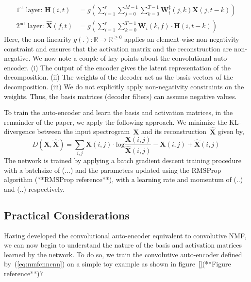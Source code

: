 \documentclass{article}
\begin{document}
\begin{align}
    \text{$1^{\text{st}}$ layer:~}\mathbf{H}(i,t) &= g\left(\sum_{i=1}^{r} \sum_{j=0}^{M-1} \sum_{k=0}^{T-1} \mathbf{W}_{i}^{\ddagger}(j,k)\mathbf{X}(j,t-k)\right) \\
    \text{$2^{\text{nd}}$ layer:~}\hat{\mathbf{X}}(f,t) &= g\left(\sum_{i=1}^{r} \sum_{k=0}^{T-1} \mathbf{W}_{i}(k,f)\cdot\mathbf{H}(i,t-k)\right)
    \label{eq:nmfcnncnn}
\end{align}
Here, the non-linearity $g(.):\mathbb{R}\rightarrow \mathbb{R}^{\geq0}$ applies an element-wise non-negativity constraint and ensures that the activation matrix and the reconstruction are non-negative. We now note a couple of key points about the convolutional auto-encoder. (i) The output of the encoder gives the latent representation of the decomposition. (ii) The weights of the decoder act as the basis vectors of the decomposition. (iii) We do not explicitly apply non-negativity constraints on the weights. Thus, the basis matrices (decoder filters) can assume negative values. 

To train the auto-encoder and learn the basis and activation matrices, in the remainder of the paper, we apply the following approach. We minimize the KL-divergence between the input spectrogram~$\mathbf{X}$ and its reconstruction~$\hat{\mathbf{X}}$ given by,
\begin{equation*}
    D\left(\mathbf{X},\hat{\mathbf{X}}\right) = \sum_{i,j} \mathbf{X}(i,j)\cdot \text{log}\frac{\mathbf{X}(i,j)}{\hat{\mathbf{X}}(i,j)} - \mathbf{X}(i,j) + \hat{\mathbf{X}}(i,j)
\end{equation*}
The network is trained by applying a batch gradient descent training procedure with a batchsize of (...) and the parameters updated using the RMSProp algorithm (**RMSProp reference**), with a learning rate and momentum of (..) and (..) respectively. 

\subsection{Practical Considerations}
\label{subsec:practical}
Having developed the convolutional auto-encoder equivalent to convolutive NMF, we can now begin to understand the nature of the basis and activation matrices learned by the network. To do so, we train the convolutive auto-encoder defined by~(\ref{eq:nmfcnncnn}) on a simple toy example as shown in figure~\ref{}(**Figure reference**)7

\end{document}
